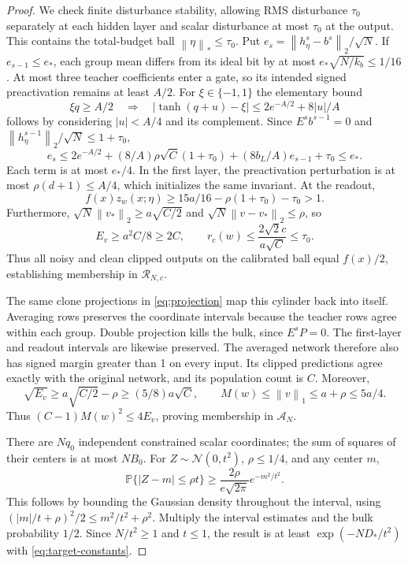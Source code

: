 \documentclass[11pt]{article}
\newcommand{\Prb}{\mathbb P}
\newcommand{\norm}[1]{\left\|#1\right\|}
\begin{document}
\begin{proof}
We check finite disturbance stability, allowing RMS disturbance $\tau_0$
separately at each hidden layer and scalar disturbance at most $\tau_0$
at the output. This contains the total-budget ball $\norm\eta_*\le\tau_0$.
Put $e_s=\norm{h^s_\eta-b^s}_2/\sqrt N$. If $e_{s-1}\le e_*$, each
group mean differs from its ideal bit by at most
$e_*\sqrt{N/k_b}\le1/16$. At most three teacher coefficients enter a
gate, so its intended signed preactivation remains at least $A/2$.
For $\xi\in\{-1,1\}$ the elementary bound
\[
 \xi q\ge A/2\quad\Longrightarrow\quad
 |\tanh(q+u)-\xi|\le2e^{-A/2}+8|u|/A
\]
follows by considering $|u|<A/4$ and its complement. Since
$E^sb^{s-1}=0$ and $\norm{h^{s-1}_\eta}_2/\sqrt N\le1+\tau_0$,
\[
 e_s\le2e^{-A/2}+(8/A)\rho\sqrt C(1+\tau_0)
                 +(8b_L/A)e_{s-1}+\tau_0\le e_*.
\]
Each term is at most $e_*/4$. In the first layer, the preactivation
perturbation is at most $\rho(d+1)\le A/4$, which initializes the same
invariant. At the readout,
\[
 f(x)z_w(x;\eta)\ge15a/16-\rho(1+\tau_0)-\tau_0>1.
\]
Furthermore, $\sqrt N\norm{v_*}_2\ge a\sqrt{C/2}$ and
$\sqrt N\norm{v-v_*}_2\le\rho$, so
\[
 E_v\ge a^2C/8\ge2C,\qquad
 r_c(w)\le\frac{2\sqrt2c}{a\sqrt C}\le\tau_0.
\]
Thus all noisy and clean clipped outputs on the calibrated ball equal
$f(x)/2$, establishing membership in $\mathcal R_{N,c}$.

The same clone projections in \eqref{eq:projection} map this cylinder
back into itself. Averaging rows preserves the coordinate intervals because
the teacher rows agree within each group. Double projection kills the
bulk, since $E^sP=0$. The first-layer and readout intervals are likewise
preserved. The averaged network therefore also has signed margin greater
than 1 on every input. Its clipped predictions agree exactly with the
original network, and its population count is $C$. Moreover,
\[
 \sqrt{E_v}\ge a\sqrt{C/2}-\rho\ge(5/8)a\sqrt C,\qquad
 M(w)\le\norm v_1\le a+\rho\le5a/4.
\]
Thus $(C-1)M(w)^2\le4E_v$, proving membership in $\mathcal A_N$.

There are $Nq_0$ independent constrained scalar coordinates; the sum of
squares of their centers is at most $NB_0$. For $Z\sim\mathcal N(0,t^2)$,
$\rho\le1/4$, and any center $m$,
\[
 \Prb\{|Z-m|\le\rho t\}
 \ge\frac{2\rho}{e\sqrt{2\pi}}e^{-m^2/t^2}.
\]
This follows by bounding the Gaussian density throughout the interval,
using $(|m|/t+\rho)^2/2\le m^2/t^2+\rho^2$.
Multiply the interval estimates and the bulk probability $1/2$.
Since $N/t^2\ge1$ and $t\le1$, the result is at least
$\exp(-ND_*/t^2)$ with \eqref{eq:target-constants}.
\end{proof}
\end{document}
